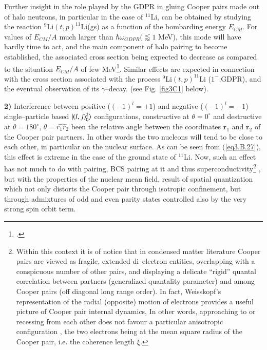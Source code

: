 \begin{subappendices}
    	Further insight in the role played by the GDPR in gluing Cooper pairs made out of halo neutrons, in particular in the case of $^{11}$Li, can be obtained by studying the reaction $^{9}$Li$(t,p)^{11}$Li(gs) as a function of the bombarding energy $E_{CM}$. For values of $E_{CM}/A$ much larger than $\hbar\omega_{GDPR} (\lessapprox 1$ MeV), this mode will have hardly time to act, and the main component of halo pairing to become established, the associated cross section being expected to decrease as compared to the situation $E_{CM}/A$ of few MeV\footnote{\cite{Tanihata:08}.}. Similar effects are expected in connection with the cross section associated with the process  $^{9}$Li$(t,p)^{11}$Li ($1^{-}$;GDPR), and the eventual observation of its $\gamma$--decay. (see Fig. \ref{fig3C1} below).
    	
    				
 \textbf{2)} Interference between positive ($(-1)^l=+1$) and negative ($(-1)^l=-1$) single--particle based $|{(l,j)^2_0} \rangle$ configurations, constructive at $\theta=0^\circ$ and destructive at $\theta=180^\circ$, $\theta=\hat{r_1r_2}$ been the relative angle between the coordinates $\mathbf r_1$ and $\mathbf r_2$ of the Cooper pair partners. In other words the two nucleons will tend to be close to each other, in particular on the nuclear surface. As can be seen from (\ref{eq3.B.27}), this effect is extreme in the case of the ground state of $^{11}$Li. Now, such an effect has not much to do with pairing, BCS pairing at it and thus superconductivity\footnote{Within this context it is of notice that in condensed matter literature Cooper pairs are viewed as fragile, extended di--electron entities, overlapping with a conspicuous number of other pairs, and displaying a delicate ``rigid'' quantal correlation between partners (generalized quantality parameter) and among Cooper pairs (off diagonal long range order). In fact, Weisskopf's representation of the radial (opposite) motion of electrons provides a useful picture of Cooper pair internal dynamics, In other words, approaching to or recessing from each other does not favour a particular anisotropic configuration , the two electrons being at the mean square radius of the Cooper pair, i.e. the coherence length $\xi$.}		, but with the properties of the nuclear mean field, result of spatial quantization which not only distorts the Cooper pair through isotropic confinement, but through admixtures of odd and even parity states controlled also by the very strong spin orbit term.									


\end{subappendices}
